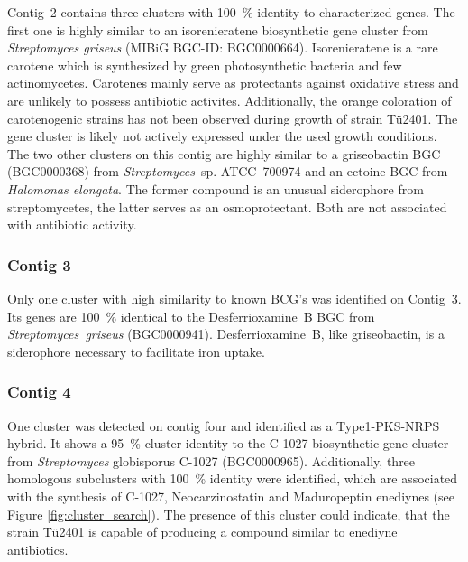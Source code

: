 Contig~2 contains three clusters with 100~\% identity to characterized genes.
The first one is highly similar to an isorenieratene biosynthetic gene cluster from \emph{Streptomyces griseus} (MIBiG BGC-ID: \textsf{BGC0000664}).
Isorenieratene is a rare carotene which is synthesized by green photosynthetic bacteria and few actinomycetes.\autocite{Krugel1999}
Carotenes mainly serve as protectants against oxidative stress and are unlikely to possess antibiotic activites.\autocite{Olson1995}
Additionally, the orange coloration of carotenogenic strains has not been observed during growth of strain Tü2401.
The gene cluster is likely not actively expressed under the used growth conditions.
The two other clusters on this contig are highly similar to a griseobactin BGC (\textsf{BGC0000368}) from \emph{Streptomyces}~sp. ATCC~700974 and an ectoine BGC from \emph{Halomonas elongata}.
The former compound is an unusual siderophore from streptomycetes, the latter serves as an osmoprotectant.\autocite{Patzer2010,Prabhu2004}
Both are not associated with antibiotic activity.

\subsubsection*{Contig 3}

Only one cluster with high similarity to known BCG's was identified on Contig~3.
Its genes are 100~\% identical to the Desferrioxamine~B BGC from \emph{Streptomyces~griseus} (\textsf{BGC0000941}).\autocite{Ohnishi2008}
Desferrioxamine~B, like griseobactin, is a siderophore necessary to facilitate iron uptake.\autocite{H.2006}

\subsubsection*{Contig 4}

One cluster was detected on contig four and identified as a Type1-PKS-NRPS hybrid.
It shows a 95~\% cluster identity to the C-1027 biosynthetic gene cluster from \textit{Streptomyces} globisporus C-1027 (\textsf{BGC0000965}). Additionally, three homologous subclusters with 100~\% identity were identified, which are associated with the synthesis of C-1027, Neocarzinostatin and Maduropeptin enediynes (see Figure \ref{fig:cluster_search}).
The presence of this cluster could indicate, that the strain Tü2401 is capable of producing a compound similar to enediyne antibiotics.


